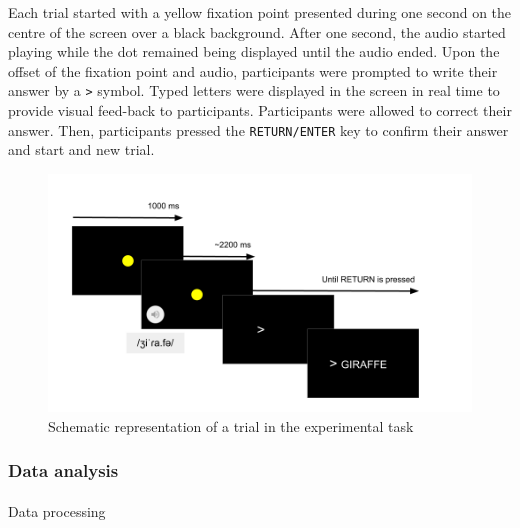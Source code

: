 \documentclass[
]{article}
\makeatletter
\let\oldparagraph\paragraph
\renewcommand{\paragraph}{
    \@ifstar
      \xxxParagraphStar
      \xxxParagraphNoStar
  }
\newcommand{\xxxParagraphStar}[1]{\oldparagraph*{#1}\mbox{}}
\newcommand{\xxxParagraphNoStar}[1]{\oldparagraph{#1}\mbox{}}
\makeatother
\begin{document}
Each trial started with a yellow fixation point presented during one
second on the centre of the screen over a black background. After one
second, the audio started playing while the dot remained being displayed
until the audio ended. Upon the offset of the fixation point and audio,
participants were prompted to write their answer by a
\texttt{\textgreater{}} symbol. Typed letters were displayed in the
screen in real time to provide visual feed-back to participants.
Participants were allowed to correct their answer. Then, participants
pressed the \texttt{RETURN/ENTER} key to confirm their answer and start
and new trial.

\begin{figure}[H]

{\centering \includegraphics{_assets/img/design.png}

}

\caption{Schematic representation of a trial in the experimental task}

\end{figure}%

\subsubsection{Data analysis}\label{data-analysis}

\paragraph{Data processing}\label{data-processing}
\end{document}
